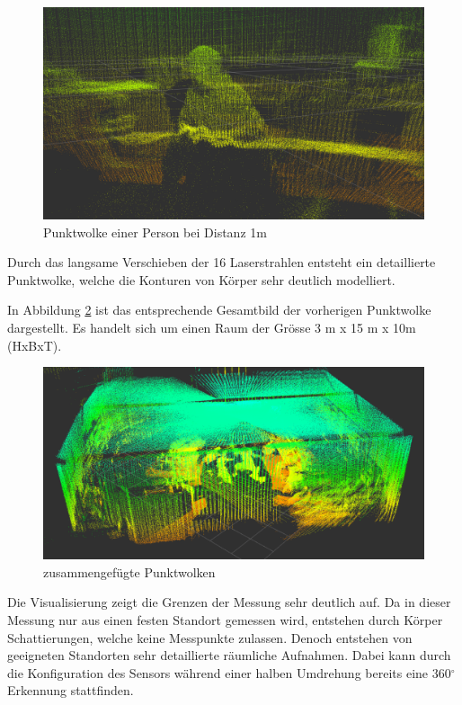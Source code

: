 \begin{figure}[H]
	\centering
	\includegraphics[width=1.0\textwidth]{resources/pointcloud_test.png}
	\caption[Punktwolke einer Person bei Distanz 1m]{Punktwolke einer Person bei Distanz 1m}
	\label{fig:pointcloud_test}
\end{figure}

Durch das langsame Verschieben der 16 Laserstrahlen entsteht ein detaillierte Punktwolke, welche die Konturen von Körper sehr deutlich modelliert.  

In Abbildung \ref{fig:raumausmessung} ist das entsprechende Gesamtbild der vorherigen Punktwolke dargestellt. Es handelt sich um einen Raum der Grösse 3 m x 15 m x 10m (HxBxT). 

\begin{figure}[H]
	\centering
	\includegraphics[width=1.0\textwidth]{resources/raumausmessung.png}
	\caption[zusammengefügte Punktwolken]{zusammengefügte Punktwolken}
	\label{fig:raumausmessung}
\end{figure}  

Die Visualisierung zeigt die Grenzen der Messung sehr deutlich auf. Da in dieser Messung nur aus einen festen Standort gemessen wird, entstehen durch Körper Schattierungen, welche keine Messpunkte zulassen. Denoch entstehen von geeigneten Standorten sehr detaillierte räumliche Aufnahmen. Dabei kann durch die Konfiguration des Sensors während einer halben Umdrehung bereits eine 360$^\circ$ Erkennung stattfinden.

